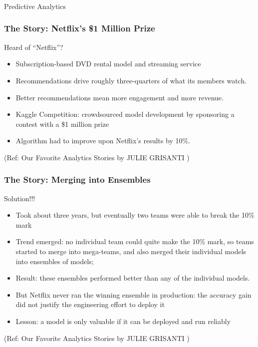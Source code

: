 \begin{frame}[fragile]\frametitle{}
\begin{center}
{\Large Predictive Analytics}


\end{center}


\end{frame}

\begin{frame}\frametitle{The Story: Netflix's \$1 Million Prize}
Heard of ``Netflix''?
\begin{itemize}
\item Subscription-based DVD rental model and streaming service
\item Recommendations drive roughly three-quarters of what its members watch.
\item Better recommendations mean more engagement and more revenue.
\item Kaggle Competition: crowdsourced model development by sponsoring a contest with a \$1 million prize
\item Algorithm had to improve upon Netflix’s results by 10\%.
\end{itemize}

{\tiny (Ref: Our Favorite Analytics Stories by JULIE GRISANTI )}

\end{frame}

\begin{frame}\frametitle{The Story: Merging into Ensembles}
Solution!!!
\begin{itemize}
\item Took about three years, but eventually two teams were able to break the 10\% mark
\item Trend emerged: no individual team could quite make the 10\% mark,
so teams started to merge into mega-teams,
and also merged their individual models into ensembles of models;
\item Result: these ensembles performed better than any of the individual models.
\item But Netflix never ran the winning ensemble in production: the accuracy gain did not justify the engineering effort to deploy it
\item Lesson: a model is only valuable if it can be deployed and run reliably

\end{itemize}

{\tiny (Ref: Our Favorite Analytics Stories by JULIE GRISANTI )}

\end{frame}

